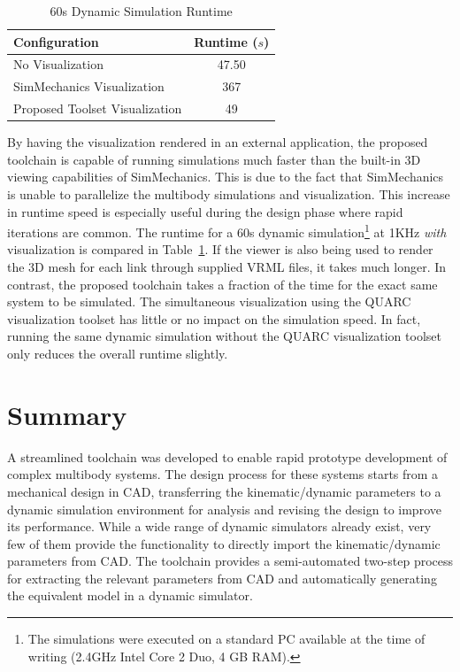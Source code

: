 \begin{table}[!h]
  \centering
  \caption{60s Dynamic Simulation Runtime}
    \begin{tabular}{lc}
    \addlinespace
    \toprule
    \textbf{Configuration} & \textbf{Runtime ($s$)}\\
    \midrule
    No Visualization 				& 47.50 	\\
    SimMechanics Visualization    	& 367	 	\\
    Proposed Toolset Visualization 	& 49 		\\
    \bottomrule
    \end{tabular}
  \label{tab:benchmark}
\end{table}

By having the visualization rendered in an external application, the proposed toolchain is capable of running simulations much faster than the built-in 3D viewing capabilities of SimMechanics. This is due to the fact that SimMechanics is unable to parallelize the multibody simulations and visualization. This increase in runtime speed is especially useful during the design phase where rapid iterations are common. The runtime for a 60s dynamic simulation\footnote{The simulations were executed on a standard PC available at the time of writing (2.4GHz Intel Core 2 Duo, 4 GB RAM).} at 1KHz \emph{with} visualization is compared in Table~\ref{tab:benchmark}. If the viewer is also being used to render the 3D mesh for each link through supplied VRML files, it takes much longer. In contrast, the proposed toolchain takes a fraction of the time for the exact same system to be simulated. The simultaneous visualization using the QUARC visualization toolset has little or no impact on the simulation speed. In fact, running the same dynamic simulation without the QUARC visualization toolset only reduces the overall runtime slightly.



\section{Summary} %
\label{sec:toolchain_summary}
A streamlined toolchain was developed to enable rapid prototype development of complex multibody systems. The design process for these systems starts from a mechanical design in CAD, transferring the kinematic/dynamic parameters to a dynamic simulation environment for analysis and revising the design to improve its performance. While a wide range of dynamic simulators already exist, very few of them provide the functionality to directly  import the kinematic/dynamic parameters from CAD. The toolchain provides a semi-automated two-step process for extracting the relevant parameters from CAD and automatically generating the equivalent model in a dynamic simulator. 


